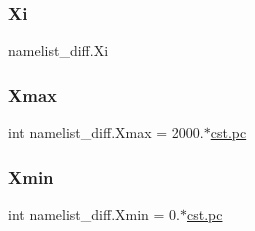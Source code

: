 \subsubsection{\texorpdfstring{Xi}{Xi}}
{\footnotesize\ttfamily namelist\+\_\+diff.\+Xi}

\mbox{\label{namespacenamelist__diff_a19c5df6452fce440c77288fb85948253}} 
\subsubsection{\texorpdfstring{Xmax}{Xmax}}
{\footnotesize\ttfamily int namelist\+\_\+diff.\+Xmax = 2000.$\ast$\hyperlink{constants_8h_a2884cd030c4c825754349a525a1d06ce}{cst.\+pc}}

\mbox{\label{namespacenamelist__diff_aff81a5db56ae8b2a95eb1b37710c77e9}} 
\subsubsection{\texorpdfstring{Xmin}{Xmin}}
{\footnotesize\ttfamily int namelist\+\_\+diff.\+Xmin = 0.$\ast$\hyperlink{constants_8h_a2884cd030c4c825754349a525a1d06ce}{cst.\+pc}}

